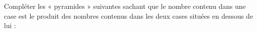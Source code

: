 
\begin{exercice}\label{exosmath-0756}

Compléter les « pyramides » suivantes sachant que le nombre contenu dans une case est le produit des nombres contenus dans les deux cases situées en dessous de lui :


\begin{multicols}{2}

\begin{center}
   
\end{center}

\columnbreak

\begin{center}
   
\end{center}

\end{multicols}

\end{exercice}
